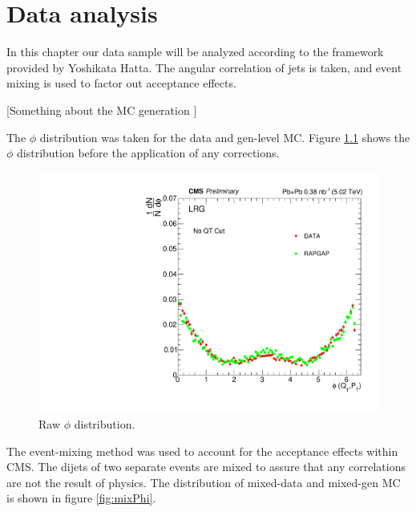 
\chapter{Data analysis}

In this chapter our data sample will be analyzed according to the framework provided by Yoshikata Hatta. The angular correlation of jets is taken, and event mixing is used to factor out acceptance effects. 

[Something about the MC generation \cite{lheFormat}]

The $\phi$ distribution was taken for the data and gen-level MC. Figure \ref{fig:rawPhi} shows the $\phi$ distribution before the application of any corrections. 

\begin{figure}[h!]
\begin{centering}
\includegraphics[width=6in]{Chapter6/importfigs/phi_allQt_raw.pdf}
\par\end{centering}
\caption{Raw $\phi$ distribution. \label{fig:rawPhi}}
\end{figure}

The event-mixing method was used to account for the acceptance effects within CMS. The dijets of two separate events are mixed to assure that any correlations are not the result of physics. The distribution of mixed-data and mixed-gen MC is shown in figure \ref{fig:mixPhi}.

